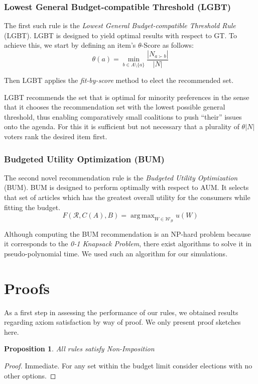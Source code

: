 \documentclass{article}
\DeclareMathOperator*{\argmax}{arg\,max}
\newtheorem{mytheorem}{Proposition}
\begin{document}
\subsubsection{Lowest General Budget-compatible Threshold (LGBT)}
The first such rule is the \emph{Lowest General Budget-compatible Threshold Rule} (LGBT). LGBT is designed to yield optimal results with respect to GT. To achieve this, we start by defining an item's $\theta$-Score as follows:
\[\theta(a)=\min_{b\in A \setminus {\{a\}}} \frac{|N_{a\succ b}|}{|N|}\]

Then LGBT applies the \emph{fit-by-score} method to elect the recommended set.

LGBT recommends the set that is optimal for minority preferences in the sense that it chooses the recommendation set with the lowest possible general threshold, thus enabling comparatively small coalitions to push ``their'' issues onto the agenda. For this it is sufficient but not necessary that a plurality of $\theta|N|$ voters rank the desired item first.

\subsubsection{Budgeted Utility Optimization (BUM)}
The second novel recommendation rule is the \emph{Budgeted Utility Optimization} (BUM). BUM is designed to perform optimally with respect to AUM. It selects that set of articles which has the greatest overall utility for the consumers while fitting the budget.
\[
F(\mathcal{R},C(A),B)=\argmax_{W\in\mathcal{ W_B}} u(W)
\]

Although computing the BUM recommendation is an NP-hard problem because it corresponds to the {\em 0-1 Knapsack Problem}, there exist algorithms to solve it in pseudo-polynomial time. We used such an algorithm for our simulations.

\hypertarget{proofs}{\section{Proofs}}%
As a first step in assessing the performance of our rules, we obtained results regarding axiom satisfaction by way of proof. We only present proof sketches here.

\begin{mytheorem}
All rules satisfy Non-Imposition
\end{mytheorem}
\begin{proof}\renewcommand{\qedsymbol}{}
Immediate. For any set within the budget limit consider elections with no other options. %
\end{proof}
\end{document}
